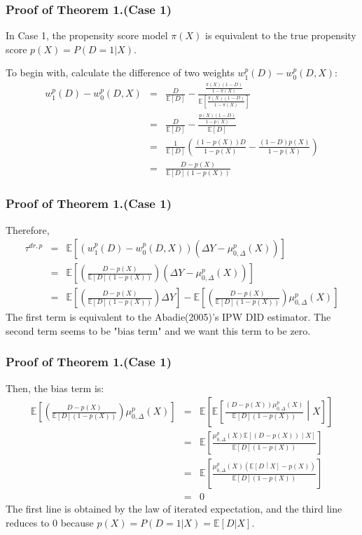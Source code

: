 \documentclass{beamer}
\begin{document}
\begin{frame}\frametitle{Proof of Theorem 1.(Case 1)}
    In Case 1, the propensity score model $\pi(X)$ is equivalent to the true propensity score $p(X) = P(D = 1|X)$. 

    To begin with, calculate the difference of two weights $w^{p}_{1}(D) - w^{p}_{0}(D,X)$:
    \begin{eqnarray*}
        w^{p}_{1}(D) - w^{p}_{0}(D,X) &=& \frac{D}{ \mathbb{E}[D]} - \frac{ \frac{\pi(X)(1-D)}{1-\pi(X)}}{ \mathbb{E}[\frac{\pi(X)(1-D)}{1-\pi(X)}]} \\
        &=& \frac{D}{\mathbb{E}[D]} - \frac{\frac{p(X)(1-D)}{1-p(X)}}{\mathbb{E}[D]} \\
        &=& \frac{1}{\mathbb{E}[D]} \left(\frac{(1-p(X))D}{1-p(X)} - \frac{(1-D)p(X)}{1-p(X)} \right) \\
        &=& \frac{D - p(X)}{\mathbb{E}[D](1-p(X))}
    \end{eqnarray*}
\end{frame}

\begin{frame}\frametitle{Proof of Theorem 1.(Case 1)}
Therefore,
    \begin{eqnarray*}
        \tau ^{dr,p} &=& \mathbb{E}\left[(w^{p}_{1}(D) - w^{p}_{0}(D,X))(\Delta Y - \mu^{p}_{0,\Delta}(X))\right] \\
        &=& \mathbb{E}\left[\left(\frac{D - p(X)}{\mathbb{E}[D](1-p(X))}\right)\left(\Delta Y - \mu^{p}_{0,\Delta}(X)\right)\right] \\
        &=& \mathbb{E}\left[\left(\frac{D - p(X)}{\mathbb{E}[D](1-p(X))}\right)\Delta Y\right] - \mathbb{E}\left[\left(\frac{D - p(X)}{\mathbb{E}[D](1-p(X))}\right)\mu^{p}_{0,\Delta}(X)\right]
    \end{eqnarray*}
The first term is equivalent to the Abadie(2005)'s IPW DID estimator. The second term seems to be "bias term" and we want this term to be zero.
\end{frame}

\begin{frame}\frametitle{Proof of Theorem 1.(Case 1)}
    Then, the bias term is:
    \begin{eqnarray*}
        \mathbb{E}\left[\left(\frac{D-p(X)}{\mathbb{E}[D](1-p(X))}\right)\mu^{p}_{0, \Delta}(X)\right] &=& \mathbb{E}\left[\mathbb{E}\left[\frac{\left(D-p(X)\right)\mu^{p}_{0,\Delta}(X)}{\mathbb{E}[D](1-p(X))}\middle| X\right]\right] \\
        &=& \mathbb{E}\left[\frac{\mu^{p}_{0,\Delta}(X)\mathbb{E}\left[(D-p(X))\middle|X\right]}{\mathbb{E}[D](1-p(X))}\right]\\
        &=& \mathbb{E}\left[\frac{\mu^{p}_{0,\Delta}(X) \left(\mathbb{E}\left[D\middle|X\right] - p(X)\right)}{\mathbb{E}\left[D\right](1-p(X))}\right] \\
        &=& 0
    \end{eqnarray*}
The first line is obtained by the law of iterated expectation, and the third line reduces to 0 because $p(X) = P(D = 1|X) = \mathbb{E}[D|X]$.
\end{frame}
\end{document}
